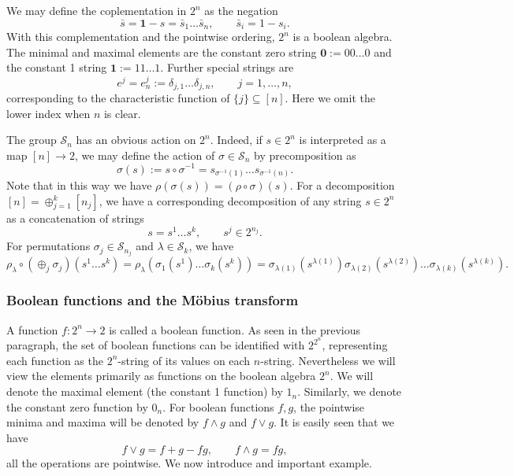 \documentclass[12pt]{article}
\theoremstyle{definition}
\theoremstyle{remark}
\def\permut{\mathscr{S}}
\begin{document}
We may define the coplementation in $2^n$ as the negation
\[
\bar s=\mathbf{1}-s=\bar s_1\dots \bar s_n, \qquad \bar s_i=1-s_i.
\]
With this complementation and 
the pointwise ordering, $2^n$ is a boolean algebra. The minimal and maximal elements are the constant zero
string $\mathbf{0}:=00\dots 0$ and the constant 1 string $\mathbf{1}:=11\dots 1$.
Further special strings are 
\[
e^j=e^j_n:=\delta_{j,1}\dots\delta_{j,n},\qquad j=1,\dots,n,
\]
corresponding to the characteristic function of $\{j\}\subseteq [n]$. Here we omit the
lower index when $n$ is clear. 

The group $\permut_n$ has an obvious action on $2^n$. Indeed,
if $s\in 2^n$ is interpreted as a map $[n]\to 2$, we may define the action of
$\sigma\in \permut_n$ by precomposition as
\[
\sigma(s):=s\circ\sigma^{-1}=s_{\sigma^{-1}(1)}\dots s_{\sigma^{-1}(n)}.
\]
Note that in this way we have $\rho(\sigma(s))=(\rho\circ \sigma)(s)$. For a decomposition
$[n]=\oplus_{j=1}^k[n_j]$, we have a corresponding decomposition of
any string $s\in 2^n$ as a concatenation of strings
\[
s=s^1\dots s^k,\qquad s^j\in 2^{n_j}.
\]
For permutations $\sigma_j\in \permut_{n_j}$ and  $\lambda\in
\permut_k$, we have
\[
\rho_\lambda\circ(\oplus_j\sigma_j)(s^1\dots s^k)=\rho_\lambda(\sigma_1(s^1)\dots
\sigma_k(s^k))=\sigma_{\lambda(1)}(s^{\lambda(1)})\sigma_{\lambda(2)}(s^{\lambda(2)})\dots
\sigma_{\lambda(k)}(s^{\lambda(k)}).
\]


\subsubsection{Boolean functions and the  M\"obius transform}


A function $f:2^n\to 2$ is called a boolean function. As seen in the previous paragraph,
the set of boolean functions can be identified with $2^{2^n}$, representing each function
as the $2^n$-string of its values on each $n$-string. Nevertheless we will view the
elements primarily as functions on the boolean algebra $2^n$.
We will
denote the maximal element (the constant 1 function) by $1_n$. Similarly,
we denote the constant zero function by $0_n$.  For boolean
functions $f,g$, the pointwise minima and maxima will be denoted by $f\wedge g$ and $f\vee
g$. It is easily seen that we have
\begin{equation}\label{eq:wedgevee_fun}
f\vee g= f+g-fg,\qquad f\wedge g=fg,
\end{equation}
all the operations are pointwise. We now introduce and important example. 
\end{document}

